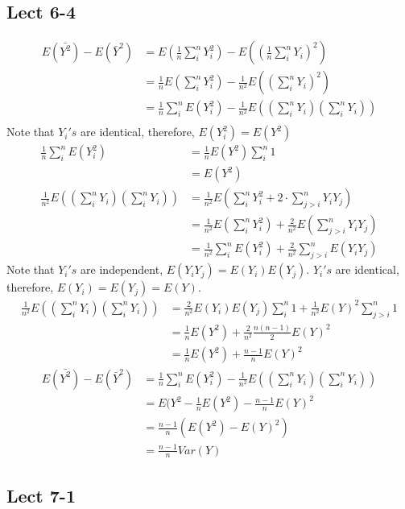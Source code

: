 \documentclass[11pt,letterpaper]{article}
\begin{document}
\subsection*{Lect 6-4}
\begin{align*}
E(\bar{Y^2}) - E(\bar{Y}^2) &= E(\frac{1}{n} \sum_i^n Y_i^2) - E((\frac{1}{n} \sum_i^n Y_i)^2) \\
&= \frac{1}{n} E(\sum_i^n Y_i^2) - \frac{1}{n^2} E((\sum_i^n Y_i) ^2) \\
&= \frac{1}{n}\sum_i^n E( Y_i^2) - \frac{1}{n^2} E((\sum_i^n Y_i) (\sum_i^n Y_i)) \\
\end{align*}
\noindent Note that $Y_i's$ are identical, therefore, $E(Y_i^2) = E(Y^2)$
\begin{align*}
\frac{1}{n}\sum_i^n E( Y_i^2) &= \frac{1}{n} E(Y^2) \sum_i^n 1 \\
&= E(Y^2) \\
\frac{1}{n^2} E((\sum_i^n Y_i) (\sum_i^n Y_i)) &= \frac{1}{n^2} E(\sum_i^n Y_i^2 + 2 \cdot \sum_{j>i}^n Y_iY_j) \\
&= \frac{1}{n^2} E( \sum_i^n Y_i^2 ) + \frac{2}{n^2} E(\sum_{j>i}^n Y_iY_j) \\
&= \frac{1}{n^2}\sum_i^n  E( Y_i^2 ) + \frac{2}{n^2} \sum_{j>i}^n E(Y_iY_j) 
\end{align*}
Note that $Y_i's$ are independent, $E(Y_iY_j) = E(Y_i)E(Y_j)$. $Y_i's$ are identical, therefore, $E(Y_i) = E(Y_j)=E(Y)$.
\begin{align*}
\frac{1}{n^2} E((\sum_i^n Y_i) (\sum_i^n Y_i)) &= \frac{2}{n^2} E(Y_i) E(Y_j) \sum_i^n 1 + \frac{1}{n^2} E(Y)^2 \sum_{j>i}^n 1 \\
&= \frac{1}{n} E(Y^2) + \frac{2}{n^2} \frac{n(n-1)}{2} E(Y)^2 \\
&= \frac{1}{n} E(Y^2) + \frac{n-1}{n} E(Y)^2 
\end{align*} 
\begin{align*}
E(\bar{Y^2}) - E(\bar{Y}^2) &= \frac{1}{n}\sum_i^n E( Y_i^2) - \frac{1}{n^2} E((\sum_i^n Y_i) (\sum_i^n Y_i)) \\
&= E(Y^2 -  \frac{1}{n} E(Y^2) - \frac{n-1}{n} E(Y)^2 \\
&= \frac{n-1}{n} (E(Y^2) - E(Y)^2) \\
&= \frac{n-1}{n} Var(Y)
\end{align*} 

\subsection*{Lect 7-1}
\end{document}
